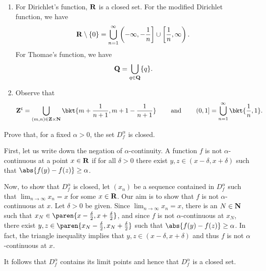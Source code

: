 \documentclass{lew98_solutions}
\begin{document}
\begin{solution}
    \begin{enumerate}
        \item For Dirichlet's function, \( \mathbf{R} \) is a closed set. For the modified Dirichlet function, we have
        \[
            \mathbf{R} \setminus \{ 0 \} = \bigcup_{n=1}^{\infty} \left( -\infty, -\frac{1}{n} \right] \cup \left[ \frac{1}{n}, \infty \right).
        \]
        For Thomae's function, we have
        \[
            \mathbf{Q} = \bigcup_{q \in \mathbf{Q}} \{ q \}.
        \]

        \item Observe that
        \[
            \setcomp{\Z} = \bigcup_{(m, n) \in \Z \times \N} \bkt{m + \frac{1}{n + 1}, m + 1 - \frac{1}{n + 1}} \hspaceand (0, 1] = \bigcup_{n=1}^{\infty} \bkt{\frac{1}{n}, 1}.
        \]
    \end{enumerate}
\end{solution}

\begin{exercise}
\label{ex:4.6.8}
    Prove that, for a fixed \( \alpha > 0 \), the set \( D_f^{\alpha} \) is closed.
\end{exercise}

\begin{solution}
    First, let us write down the negation of \( \alpha \)-continuity. A function \( f \) is not \( \alpha \)-continuous at a point \( x \in \mathbf{R} \) if for all \( \delta > 0 \) there exist \( y, z \in (x - \delta, x + \delta) \) such that \( \abs{f(y) - f(z)} \geq \alpha \).

    Now, to show that \( D_f^{\alpha} \) is closed, let \( (x_n) \) be a sequence contained in \( D_f^{\alpha} \) such that \( \lim_{n \to \infty} x_n = x \) for some \( x \in \mathbf{R} \). Our aim is to show that \( f \) is not \( \alpha \)-continuous at \( x \). Let \( \delta > 0 \) be given. Since \( \lim_{n \to \infty} x_n = x \), there is an \( N \in \mathbf{N} \) such that \( x_N \in \paren{x - \tfrac{\delta}{2}, x + \tfrac{\delta}{2}} \), and since \( f \) is not \( \alpha \)-continuous at \( x_N \), there exist \( y, z \in \paren{x_N - \tfrac{\delta}{2}, x_N + \tfrac{\delta}{2}} \) such that \( \abs{f(y) - f(z)} \geq \alpha \). In fact, the triangle inequality implies that \( y, z \in (x - \delta, x + \delta) \) and thus \( f \) is not \( \alpha \)-continuous at \( x \).

    It follows that \( D_f^{\alpha} \) contains its limit points and hence that \( D_f^{\alpha} \) is a closed set.
\end{solution}
\end{document}
